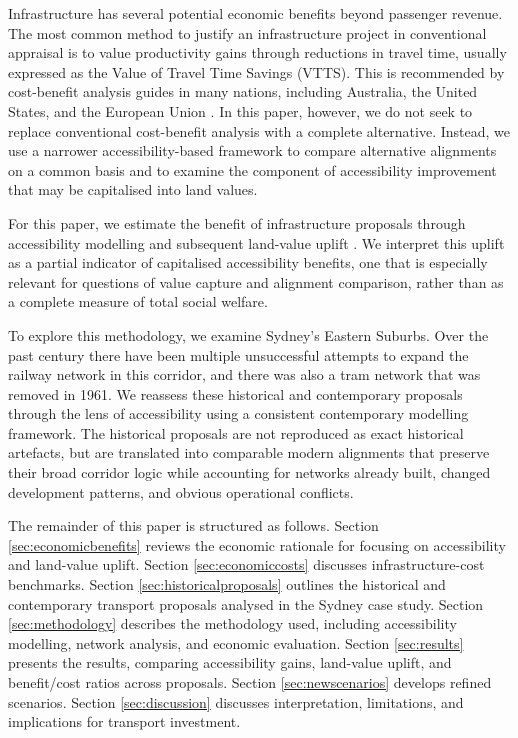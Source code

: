 \documentclass[preprint,12pt,authoryear]{elsarticle}
\begin{document}
{Infrastructure has several potential economic benefits beyond passenger revenue. The most common method to justify an infrastructure project in conventional appraisal is to value productivity gains through reductions in travel time, usually expressed as the Value of Travel Time Savings (VTTS). This is recommended by cost-benefit analysis guides in many nations, including Australia, the United States, and the European Union \parencite{TfNSW2024,FRA2016,EuropeanCommission2014}. In this paper, however, we do not seek to replace conventional cost-benefit analysis with a complete alternative. Instead, we use a narrower accessibility-based framework to compare alternative alignments on a common basis and to examine the component of accessibility improvement that may be capitalised into land values.}

{For this paper, we estimate the benefit of infrastructure proposals through accessibility modelling and subsequent land-value uplift \parencite{iacono2012value}. We interpret this uplift as a partial indicator of capitalised accessibility benefits, one that is especially relevant for questions of value capture and alignment comparison, rather than as a complete measure of total social welfare.}

{To explore this methodology, we examine Sydney's Eastern Suburbs. Over the past century there have been multiple unsuccessful attempts to expand the railway network in this corridor, and there was also a tram network that was removed in 1961. We reassess these historical and contemporary proposals through the lens of accessibility using a consistent contemporary modelling framework. The historical proposals are not reproduced as exact historical artefacts, but are translated into comparable modern alignments that preserve their broad corridor logic while accounting for networks already built, changed development patterns, and obvious operational conflicts.}


{The remainder of this paper is structured as follows. Section \ref{sec:economicbenefits} reviews the economic rationale for focusing on accessibility and land-value uplift. Section \ref{sec:economiccosts} discusses infrastructure-cost benchmarks. Section \ref{sec:historicalproposals} outlines the historical and contemporary transport proposals analysed in the Sydney case study. Section \ref{sec:methodology} describes the methodology used, including accessibility modelling, network analysis, and economic evaluation. Section \ref{sec:results} presents the results, comparing accessibility gains, land-value uplift, and benefit/cost ratios across proposals. Section \ref{sec:newscenarios} develops refined scenarios. Section \ref{sec:discussion} discusses interpretation, limitations, and implications for transport investment.}
\end{document}
